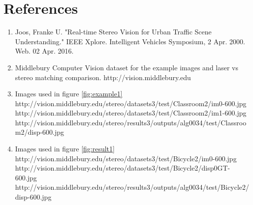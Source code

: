\documentclass[11pt,fleqn]{article}
\begin{document}
\section{References}

\begin{enumerate}
\item Joos, Franke U. "Real-time Stereo Vision for Urban Traffic Scene Understanding." IEEE Xplore. Intelligent Vehicles Symposium, 2 Apr. 2000. Web. 02 Apr. 2016.
\item Middlebury Computer Vision dataset for the example images and laser vs stereo matching comparison.  
\small
http://vision.middlebury.edu
\normalsize

\item Images used in figure \ref{fig:example1}\\  
\small
http://vision.middlebury.edu/stereo/datasets3/test/Classroom2/im0-600.jpg\\
http://vision.middlebury.edu/stereo/datasets3/test/Classroom2/im1-600.jpg\\
http://vision.middlebury.edu/stereo/results3/outputs/alg0034/test/Classroom2/disp-600.jpg
\normalsize

\item Images used in figure \ref{fig:result1}\\  
\small
http://vision.middlebury.edu/stereo/datasets3/test/Bicycle2/im0-600.jpg\\
http://vision.middlebury.edu/stereo/datasets3/test/Bicycle2/disp0GT-600.jpg\\
http://vision.middlebury.edu/stereo/results3/outputs/alg0034/test/Bicycle2/disp-600.jpg
\normalsize
\end{enumerate}
\end{document}
